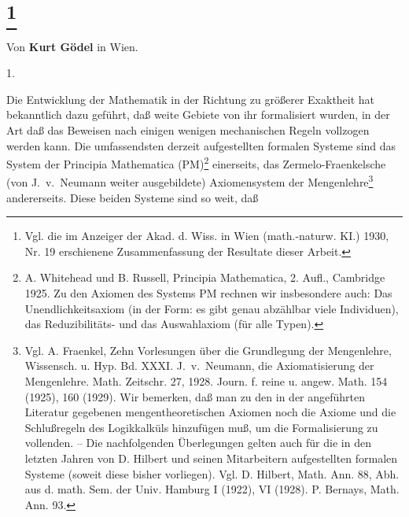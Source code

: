 \documentclass[draft]{scrartcl}
\begin{document}



\section*{\protect\footnote{Vgl. die im Anzeiger der Akad. d. Wiss. in Wien
(math.-naturw. KI.) 1930, Nr. 19 erschienene Zusammenfassung der Resultate dieser Arbeit.}}

\begin{center}
Von \textbf{Kurt Gödel} in Wien.
\end{center}

\begin{center}
1.
\end{center}

Die Entwicklung der Mathematik in der Richtung zu
größerer
Exaktheit hat bekanntlich dazu geführt, daß weite Gebiete
von ihr formalisiert wurden, in der Art daß das Beweisen
nach einigen wenigen mechanischen Regeln vollzogen werden
kann. Die umfassendsten derzeit aufgestellten formalen
Systeme sind das System der Principia Mathematica
(PM)\footnote{A. Whitehead und B. Russell, Principia
Mathematica, 2. Aufl., Cambridge 1925. Zu den Axiomen
des Systems PM rechnen wir insbesondere auch:
Das Unendlichkeitsaxiom (in der Form: es gibt
genau abzählbar viele Individuen),
das Reduzibilitäts- und das Auswahlaxiom (für alle
Typen).} einerseits, das Zermelo-Fraenkelsche
(von J.~v.~Neumann weiter ausgebildete) Axiomensystem
der Mengenlehre\footnote{Vgl. A. Fraenkel, Zehn
Vorlesungen über die Grundlegung der Mengenlehre,
Wissensch. u. Hyp. Bd. XXXI. J.~v.~Neumann, die
Axiomatisierung der Mengenlehre. Math. Zeitschr. 27,
1928. Journ. f. reine u. angew. Math. 154 (1925),
160 (1929). Wir bemerken, daß man zu den in der
angeführten Literatur gegebenen mengentheoretischen
Axiomen noch die Axiome und die Schlußregeln des
Logikkalküls hinzufügen muß, um die Formalisierung
zu vollenden. -- Die nachfolgenden Überlegungen gelten
auch für die in den letzten Jahren von D. Hilbert und
seinen Mitarbeitern aufgestellten formalen Systeme
(soweit diese bisher vorliegen). Vgl. D. Hilbert,
Math. Ann. 88, Abh. aus d. math. Sem. der Univ.
Hamburg I (1922), VI (1928). P. Bernays, Math. Ann. 93.}
andererseits. Diese beiden Systeme sind so weit, daß
\end{document}
